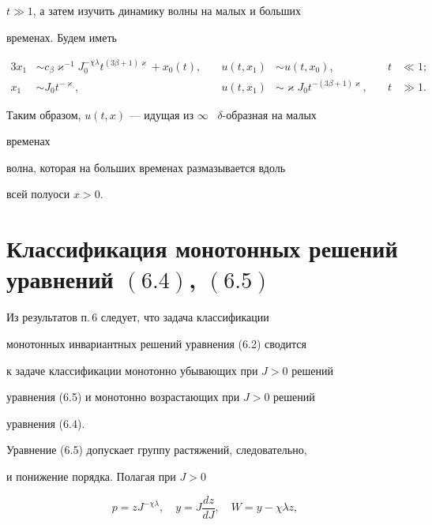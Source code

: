 $t\gg1$, а затем изучить динамику волны на малых и больших  


временах. Будем иметь 


\begin{alignat*}{3} 


x_1&\sim c_\beta\varkappa^{-1}J_0^{-\chi\lambda} 


t^{(3\beta+1)\varkappa}+x_0(t), &\quad u(t,x_1)&\sim 


u(t,x_0), &\quad t&\ll1;\\ 


x_1&\sim J_0t^{-\varkappa}, &\quad u(t,x_1)&\sim 


\varkappa J_0t^{-(3\beta+1)\varkappa},&\quad t&\gg1. 


\end{alignat*} 


Таким образом, $u(t,x)$ --- идущая из $\infty$ \ $\delta$-образная на малых 


временах  


волна, которая на больших временах размазывается вдоль  


всей полуоси $x>0$. 


 


\section{Классификация монотонных решений уравнений $(6.4)$, $(6.5)$} 


 


Из результатов п.\,6 следует, что задача классификации  


монотонных инвариантных решений уравнения (6.2) сводится  


к задаче классификации монотонно убывающих при $J>0$ решений  


уравнения (6.5) и монотонно возрастающих при $J>0$ решений 


уравнения (6.4). 


 


Уравнение (6.5) допускает группу растяжений, следовательно,  


и понижение порядка. Полагая при $J>0$  


\begin{equation} 


p=z J^{-\chi\lambda},\quad y=J\frac{dz}{dJ},\quad 


W=y-\chi\lambda z, 


\end{equation} 



